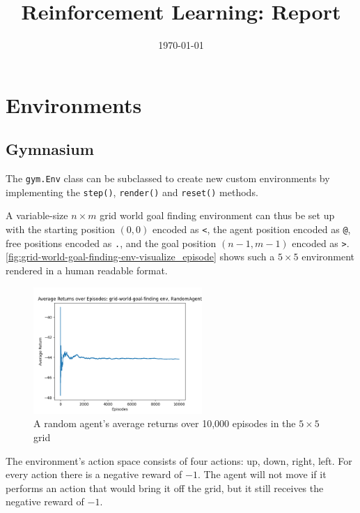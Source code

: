 \documentclass[12pt]{article}
\title{Reinforcement Learning: Report}
\author{}
\date{\today}
\begin{document}
\maketitle

\setcounter{tocdepth}{2}
\tableofcontents
\listoffigures
\thispagestyle{empty}
\setcounter{page}{0}
\newpage

\section{Environments}

\subsection{Gymnasium}

The \texttt{gym.Env} class can be subclassed to create new custom environments by
implementing the \texttt{step()}, \texttt{render()} and \texttt{reset()} methods.

A variable-size $n \times m$ grid world goal finding environment can thus be set up
with the starting position $(0, 0)$ encoded as \texttt{<},
the agent position encoded as \texttt{@},
free positions encoded as \texttt{.},
and the goal position $(n - 1, m - 1)$ encoded as \texttt{>}.
\autoref{fig:grid-world-goal-finding-env-visualize_episode} shows such a $5 \times 5$ environment rendered
in a human readable format.

\begin{figure}
	\centering
	\includegraphics[width=0.57\textwidth]{figures/grid-world-goal-finding_average-returns.png}
	\caption{A random agent's average returns over 10,000 episodes in the $5 \times 5$ grid}
	\label{fig:grid-world-goal-finding_average-returns}
\end{figure}

The environment's action space consists of four actions: up, down, right, left.
For every action there is a negative reward of $-1$.
The agent will not move if it performs an action that would bring it off the grid,
but it still receives the negative reward of $-1$.
\end{document}
